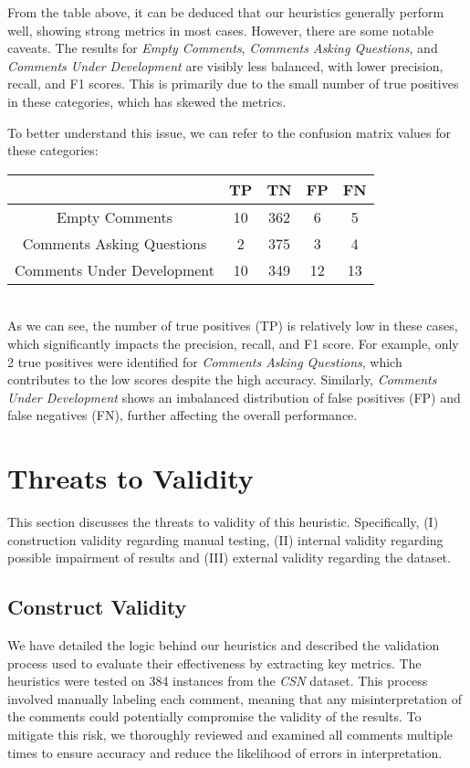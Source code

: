\noindent From the table above, it can be deduced that our heuristics generally perform well, showing strong metrics in most cases. However, there are some notable caveats. The results for \textit{Empty Comments}, \textit{Comments Asking Questions}, and \textit{Comments Under Development} are visibly less balanced, with lower precision, recall, and F1 scores. This is primarily due to the small number of true positives in these categories, which has skewed the metrics.

\noindent To better understand this issue, we can refer to the confusion matrix values for these categories:
\begin{center}
	\begin{tabular}{|c|c|c|c|c|}
		\hline
		& \textbf{TP} & \textbf{TN} & \textbf{FP} & \textbf{FN} \\
		\hline Empty Comments             & 10     & 362      & 6   & 5    \\
		\hline Comments Asking Questions  & 2     & 375      & 3   & 4    \\
		\hline Comments Under Development & 10     & 349      & 12   & 13    \\
		\hline
	\end{tabular}
\end{center}

\noindent \\ As we can see, the number of true positives (TP) is relatively low in these cases, which significantly impacts the precision, recall, and F1 score. For example, only 2 true positives were identified for \textit{Comments Asking Questions}, which contributes to the low scores despite the high accuracy. Similarly, \textit{Comments Under Development} shows an imbalanced distribution of false positives (FP) and false negatives (FN), further affecting the overall performance.

\section{Threats to Validity}
This section discusses the threats to validity of this heuristic. Specifically, (I) construction validity regarding manual testing, (II) internal validity regarding possible impairment of results and (III) external validity regarding the dataset.

\subsection{Construct Validity}
We have detailed the logic behind our heuristics and described the validation process used to evaluate their effectiveness by extracting key metrics. The heuristics were tested on 384 instances from the \textit{CSN} dataset. This process involved manually labeling each comment, meaning that any misinterpretation of the comments could potentially compromise the validity of the results. To mitigate this risk, we thoroughly reviewed and examined all comments multiple times to ensure accuracy and reduce the likelihood of errors in interpretation.

